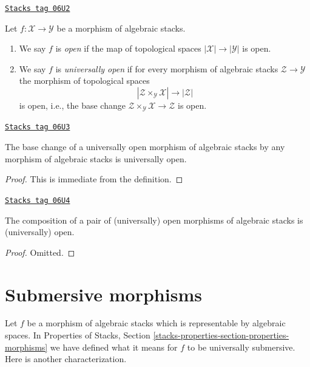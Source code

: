 \begin{definition}[Open]
\label{stacks-morphisms-definition-open}
\href{https://stacks.math.columbia.edu/tag/06U2}{\texttt{Stacks tag 06U2}}

Let $f : \mathcal{X} \to \mathcal{Y}$ be a morphism of algebraic stacks.
\begin{enumerate}
\item We say $f$ is {\it open} if the map of topological
spaces $|\mathcal{X}| \to |\mathcal{Y}|$ is open.
\item We say $f$ is {\it universally open} if for every morphism
of algebraic stacks $\mathcal{Z} \to \mathcal{Y}$
the morphism of topological spaces
$$
|\mathcal{Z} \times_\mathcal{Y} \mathcal{X}| \to |\mathcal{Z}|
$$
is open, i.e., the base change
$\mathcal{Z} \times_\mathcal{Y} \mathcal{X} \to \mathcal{Z}$ is open.
\end{enumerate}
\end{definition}

\begin{lemma}
\label{stacks-morphisms-lemma-base-change-universally-open}
\href{https://stacks.math.columbia.edu/tag/06U3}{\texttt{Stacks tag 06U3}}

The base change of a universally open morphism of algebraic stacks
by any morphism of algebraic stacks is universally open.
\end{lemma}

\begin{proof}
This is immediate from the definition.
\end{proof}

\begin{lemma}
\label{stacks-morphisms-lemma-composition-universally-open}
\href{https://stacks.math.columbia.edu/tag/06U4}{\texttt{Stacks tag 06U4}}

The composition of a pair of (universally) open morphisms of
algebraic stacks is (universally) open.
\end{lemma}

\begin{proof}
Omitted.
\end{proof}

\section{Submersive morphisms}
\label{stacks-morphisms-section-submersive}
Let $f$ be a morphism of algebraic stacks which is representable by
algebraic spaces. In
Properties of Stacks, Section
\ref{stacks-properties-section-properties-morphisms}
we have defined what it means for $f$ to be universally submersive.
Here is another characterization.

